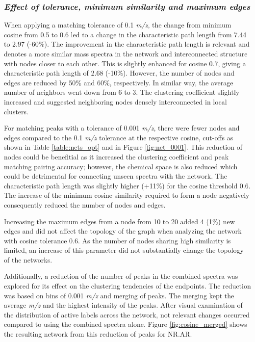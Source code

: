 \subsubsection*{\textit{Effect of tolerance, minimum similarity and maximum edges}}

When applying a matching tolerance of 0.1 \textit{m/z}, the change from minimum cosine from 0.5 to 0.6 led to a change in the characteristic path length from 7.44 to 2.97 (-60\%). The improvement in the characteristic path length is relevant and denotes a more similar mass spectra in the network and interconnected structure with nodes closer to each other. This is slightly enhanced for cosine 0.7, giving a characteristic path length of 2.68 (-10\%). However, the number of nodes and edges are reduced by 50\% and  60\%, respectively. In similar way, the average number of neighbors went down from 6 to 3. The clustering coefficient slightly increased and suggested neighboring nodes densely interconnected in local clusters. 

For matching peaks with a tolerance of 0.001 \textit{m/z}, there were fewer nodes and edges compared to the 0.1 \textit{m/z} tolerance at the respective cosine, cut-offs as shown in Table \ref{table:nets_opt} and in Figure \ref{fig:net_0001}. This reduction of nodes could be benefitial as it increased the clustering coefficient and peak matching pairing accuracy; however, the chemical space is also reduced which could be detrimental for connecting unseen spectra with the network. The characteristic path length was slightly higher (+11\%) for the cosine threshold 0.6. The increase of the minimum cosine similarity required to form a node negatively consequently reduced the number of nodes and edges.

Increasing the maximum edges from a node from 10 to 20 added 4 (1\%) new edges and did not affect the topology of the graph when analyzing the network with cosine tolerance 0.6. As the number of nodes sharing high similarity is limited, an increase of this parameter did not substantially change the topology of the networks.

Additionally, a reduction of the number of peaks in the combined spectra was explored for its effect on the clustering tendencies of the endpoints. The reduction was based on bins of 0.001 \textit{m/z} and merging of peaks. The merging kept the average \textit{m/z} and the highest intensity of the peaks. After visual examination of the distribution of active labels across the network, not relevant changes occurred compared to using the combined spectra alone. Figure \ref{fig:cosine_merged} shows the resulting network from this reduction of peaks for NR.AR.


